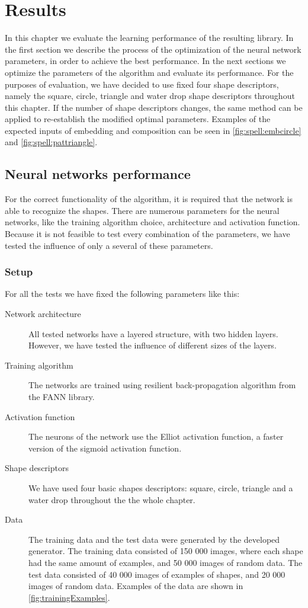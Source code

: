 \chapter{Results}
In this chapter we evaluate the learning performance of the resulting library. In the first section we describe the process of the optimization of the neural network parameters, in order to achieve the best performance. In the next sections we optimize the parameters of the algorithm and evaluate its performance. For the purposes of evaluation, we have decided to use fixed four shape descriptors, namely the square, circle, triangle and water drop shape descriptors throughout this chapter. If the number of shape descriptors changes, the same method can be applied to re-establish the modified optimal parameters. Examples of the expected inputs of embedding and composition can be seen in \cref{fig:spell:embcircle} and \cref{fig:spell:pattriangle}.
\section{Neural networks performance}
For the correct functionality of the algorithm, it is required that the network is able to recognize the shapes. There are numerous parameters for the neural networks, like the training algorithm choice, architecture and activation function. Because it is not feasible to test every combination of the parameters, we have tested the influence of only a several of these parameters.

\subsection{Setup}
For all the tests we have fixed the following parameters like this:
\begin{description}
\item [Network architecture] All tested networks have a layered structure, with two hidden layers. However, we have tested the influence of different sizes of the layers.
\item [Training algorithm] The networks are trained using resilient back-propagation algorithm from the FANN library.
\item [Activation function] The neurons of the network use the Elliot activation function, a faster version of the sigmoid activation function.
\item [Shape descriptors] We have used four basic shapes descriptors: square, circle, triangle and a water drop throughout the the whole chapter. 
\item [Data] The training data and the test data were generated by the developed generator. The training data consisted of 150 000 images, where each shape had the same amount of examples, and 50 000 images of random data. The test data consisted of 40 000 images of examples of shapes, and 20 000 images of random data. Examples of the data are shown in \cref{fig:trainingExamples}.
\end{description}

